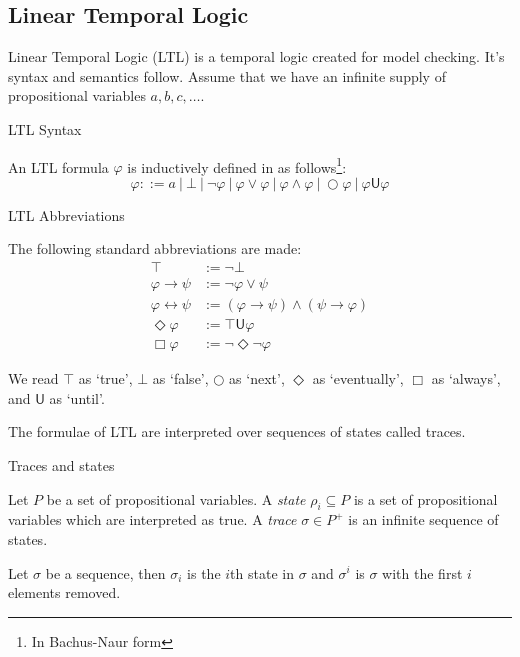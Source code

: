 \documentclass[a4paper]{article}
\newcommand{\U}{\mathsf{U}}
\begin{document}
\subsection{Linear Temporal Logic}
Linear Temporal Logic (LTL)\autocite{pnueli1977temporal} is a temporal logic created for model checking. It's syntax and semantics follow. Assume that we have an infinite supply of propositional variables $a,b,c,\dots$.
\begin{defn}{LTL Syntax}

  An LTL formula $\varphi$ is inductively defined in as follows\footnote{In Bachus-Naur form}:
  \[\varphi ::= a ~|~ \bot ~|~ \neg \varphi ~|~\varphi \lor \varphi ~|~ \varphi \land \varphi ~|~ \bigcirc \varphi ~|~ \varphi \U\varphi\]
\end{defn}
\begin{notn}{LTL Abbreviations}

  The following standard abbreviations are made:
  \begin{align*}
    \top &:= \neg \bot\\
    \varphi \to \psi &:= \neg \varphi \lor \psi\\
    \varphi \leftrightarrow \psi &:= (\varphi \to \psi) \land (\psi \to \varphi)\\
    \Diamond \varphi &:= \top \U{} \varphi\\
    \Box \varphi &:= \neg\Diamond\neg\varphi
  \end{align*}
\end{notn}

We read $\top$ as `true', $\bot$ as `false', $\bigcirc$ as `next', $\Diamond$ as `eventually', $\Box$ as `always', and $\U$ as `until'.

The formulae of LTL are interpreted over sequences of states called traces.

\begin{defn}{Traces and states}

  Let $P$ be a set of propositional variables. A \emph{state} $\rho_i \subseteq P$ is a set of propositional variables which are interpreted as true. A \emph{trace} $\sigma \in P^+$ is an infinite sequence of states.
\end{defn}

\begin{notn}
Let $\sigma$ be a sequence, then $\sigma_i$ is the $i$th state in $\sigma$ and $\sigma^i$ is $\sigma$ with the first $i$ elements removed.
\end{notn}
\end{document}
